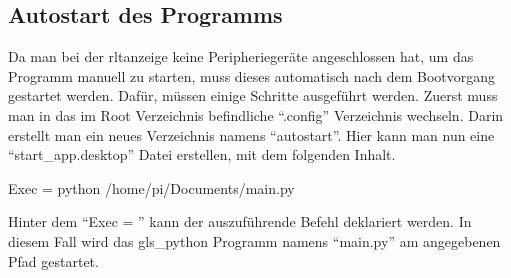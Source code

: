 \subsection{Autostart des Programms} \label{autostart}
Da man bei der \acs{rltanzeige} keine Peripheriegeräte angeschlossen hat, um das Programm manuell zu starten, muss dieses automatisch nach dem Bootvorgang gestartet werden. Dafür, müssen einige Schritte ausgeführt werden. \newline Zuerst muss man in das im Root Verzeichnis befindliche \enquote{.config} Verzeichnis wechseln. Darin erstellt man ein neues Verzeichnis namens \enquote{autostart}. Hier kann man nun eine \enquote{start\_app.desktop} Datei erstellen, mit dem folgenden Inhalt.
\begin{textcode}
Exec = python /home/pi/Documents/main.py
\end{textcode}
Hinter dem \enquote{Exec = } kann der auszuführende Befehl deklariert werden. In diesem Fall wird das \gls{gls_python} Programm namens \enquote{main.py} am angegebenen Pfad gestartet. \cite[vgl.][]{Grace_Xing:2021}
